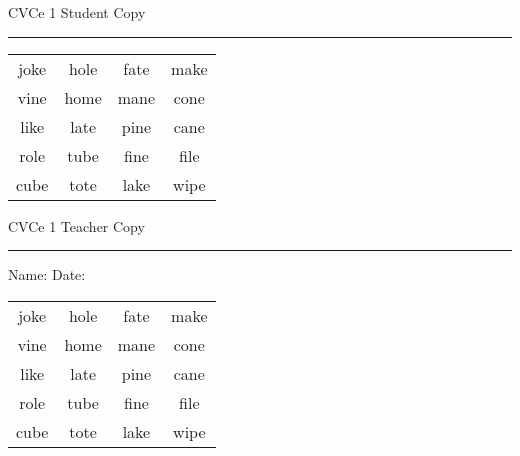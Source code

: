 \documentclass{memoir}
\begin{document}

\footnotesize \noindent
CVCe 1 \hfill Student Copy
\smallskip
\hrule

\Large

\setlength{\tabcolsep}{14pt}
\def\arraystretch{2}

{\selectfont


\begin{vplace}[0.5]
\begin{center}
\begin{tabular}{cccc}
joke & hole & fate & make \\
vine & home & mane & cone \\
like & late & pine & cane \\
role & tube & fine & file \\
cube & tote & lake & wipe \\
\end{tabular}
\end{center}
\end{vplace}

}

\newpage

\footnotesize \noindent
CVCe 1 \hfill Teacher Copy
\smallskip
\hrule

\small

\vfill

\noindent
Name: \underline{\hspace{1.75in}} \hfill Date: \underline{\hspace{1in}}

\Large

{\selectfont


\begin{vplace}[0.5]
\begin{center}
\begin{tabular}{cccc}
joke & hole & fate & make \\
vine & home & mane & cone \\
like & late & pine & cane \\
role & tube & fine & file \\
cube & tote & lake & wipe \\
\end{tabular}
\end{center}
\end{vplace}



}
\end{document}
